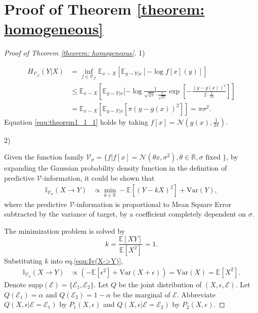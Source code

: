 \section{Proof of Theorem \ref{theorem: homogeneous}}
\label{proof:homogeneous}
\begin{proof}[Proof of Theorem \ref{theorem: homogeneous}]
\quad

1)

\begin{align}
    H_{\mathcal V_{\mathcal G}}(Y|X) &= \inf\limits_{f\in \mathcal V_{\mathcal G}}\mathbb{E}_{x\sim X} \left[\mathbb E_{y \sim Y|x}[-\log f[x](y)] \right] \\
    \label{equ:theorem1_1_1}
    &\leq \mathbb{E}_{x\sim X} \left[\mathbb E_{y \sim Y|x}[-\log \frac{1}{\sqrt{2\pi} \cdot \frac{1}{\sqrt{2\pi}}} \exp{ \left[-\frac{(y-g(x))^2}{2\cdot \frac{1}{2\pi} } \right] } \right] \\
    &= \mathbb{E}_{x\sim X} \left[\mathbb E_{y \sim Y|x}[\pi (y-g(x))^2 ] \right] = \pi\sigma^2.
\end{align}
Equation \ref{equ:theorem1_1_1} holds by taking $f[x] = \mathcal N(g(x), \frac{1}{2\pi})$.

2) 

Given the function family $\mathcal{V}_\sigma=\{f | f[x]=\mathcal{N}(\theta x,\sigma^2), \theta \in \mathbb R, \sigma \text{ fixed }\}$, by expanding the Gaussian probability density function in the definition of predictive $\mathcal V$-information, it could be shown that 
\begin{align}
\label{equ:Iv(X->Y)}
    \mathbb{I}_{\mathcal{V}_\sigma}(X\rightarrow Y) &\propto \min_{k\in \mathbb R} -\mathbb{E}[(Y-kX)^2] + \text{Var}(Y),
\end{align}
where the predictive $\mathcal V$-information is proportional to Mean Square Error subtracted by the variance of target, by a coefficient completely dependent on $\sigma$.

The minimization problem is solved by 
\begin{equation}
    k = \frac{\mathbb E[XY]}{\mathbb E[X^2]} = 1.
\end{equation}
Substituting $k$ into eq.\ref{equ:Iv(X->Y)},
\begin{align}
    \mathbb{I}_{\mathcal{V}_\sigma}(X\rightarrow Y) &\propto (-\mathbb E[\epsilon^2] + \text{Var}(X+\epsilon))=\text{Var}(X) = \mathbb E[X^2].
\end{align}
Denote $\text{supp}(\mathcal{E})=\{\mathcal{E}_1,\mathcal{E}_2\}$. Let $Q$ be the joint distribution of $(X,\epsilon,\mathcal E)$. 
Let $Q(\mathcal E_1)=\alpha$ and $ Q(\mathcal E_2)=1-\alpha $ be the marginal of $\mathcal E$. Abbreviate $Q(X,\epsilon|\mathcal E=\mathcal E_1)$ by $P_1(X,\epsilon)$ and $Q(X,\epsilon|\mathcal E=\mathcal E_2)$ by $P_2(X,\epsilon)$.


\end{proof}
